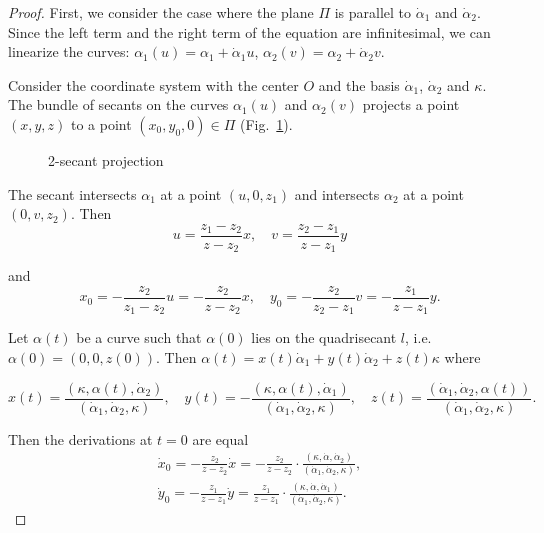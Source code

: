 \documentclass[10pt,a4paper]{amsart}
\begin{document}
\begin{proof}
    First, we consider the case where the plane $\Pi$ is parallel to $\dot\alpha_1$ and $\dot\alpha_2$. Since the left term and the right term of the equation are infinitesimal, we can linearize the curves: $\alpha_1(u)=\alpha_1+\dot\alpha_1u$, $\alpha_2(v)=\alpha_2+\dot\alpha_2v$.

    Consider the coordinate system with the center $O$ and the basis $\dot\alpha_1$, $\dot\alpha_2$ and $\kappa$. The bundle of secants on the curves $\alpha_1(u)$ and $\alpha_2(v)$ projects a point $(x,y,z)$ to a point $(x_0,y_0,0)\in\Pi$ (Fig.~\ref{fig:secant_sheaf}).

\begin{figure}
    \centering
    
    \caption{2-secant projection}
    \label{fig:secant_sheaf}
\end{figure}

The secant intersects $\alpha_1$ at a point $(u,0,z_1)$ and intersects $\alpha_2$ at a point $(0,v,z_2)$. Then
\begin{equation}\label{eq:xy_to_uv}
u=\frac{z_1-z_2}{z-z_2}x,\quad v=\frac{z_2-z_1}{z-z_1}y
\end{equation}

and
\[
x_0=-\frac{z_2}{z_1-z_2}u=-\frac{z_2}{z-z_2}x,\quad y_0=-\frac{z_2}{z_2-z_1}v=-\frac{z_1}{z-z_1}y.
\]

Let $\alpha(t)$ be a curve such that $\alpha(0)$ lies on the quadrisecant $l$, i.e. $\alpha(0)=(0,0,z(0))$. Then $\alpha(t)=x(t)\dot\alpha_1+y(t)\dot\alpha_2+z(t)\kappa$ where

\begin{equation}\label{eq:alpha_to_xyz}
x(t)=\frac{(\kappa,\alpha(t),\dot\alpha_2)}{(\dot\alpha_1,\dot\alpha_2,\kappa)},\quad
y(t)=-\frac{(\kappa,\alpha(t),\dot\alpha_1)}{(\dot\alpha_1,\dot\alpha_2,\kappa)},\quad
z(t)=\frac{(\dot\alpha_1,\dot\alpha_2,\alpha(t))}{(\dot\alpha_1,\dot\alpha_2,\kappa)}.
\end{equation}

Then the derivations at $t=0$ are equal
\begin{equation}\label{eq:x0y0_derivation}
\begin{gathered}
    \dot x_0=-\frac{z_2}{z-z_2}\dot x=-\frac{z_2}{z-z_2}\cdot\frac{(\kappa,\dot\alpha,\dot\alpha_2)}{(\dot\alpha_1,\dot\alpha_2,\kappa)},\\
    \dot y_0=-\frac{z_1}{z-z_1}\dot y=\frac{z_1}{z-z_1}\cdot\frac{(\kappa,\dot\alpha,\dot\alpha_1)}{(\dot\alpha_1,\dot\alpha_2,\kappa)}.
\end{gathered}
\end{equation}


\end{proof}
\end{document}
